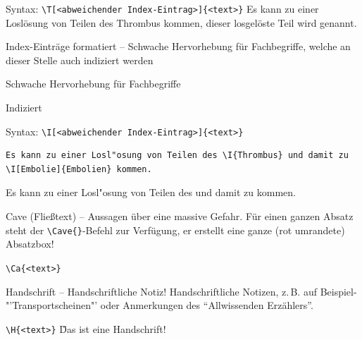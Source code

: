 \documentclass[
ngerman,
paper=a4,
asymmetric,
fontsize=10pt,
draft=false,
numbers=noenddot,
bibtotocnumbered,
footnotes=multiple,
toc=flat,
]{scrbook}
\newenvironment{Beispiel}
{\begin{tcolorbox}[title=Beispiel]

}{\end{tcolorbox}}
\begin{document}
\begin{Beispiel}
Syntax: \lstinline$\T[<abweichender Index-Eintrag>]{<text>}$
\tcblower
Es kann zu einer Loslösung von Teilen des Thrombus kommen, dieser
losgelöste Teil wird  genannt.
\end{Beispiel}






\TextSlide
{Index-Einträge formatiert -- }
{Schwache Hervorhebung für Fachbegriffe, welche an dieser
Stelle auch indiziert werden}
{Schwache Hervorhebung für
Fachbegriffe

Indiziert}
{}
{}
{}


\begin{Beispiel}
Syntax: \lstinline$\I[<abweichender Index-Eintrag>]{<text>}$

\begin{lstlisting}
Es kann zu einer Losl"osung von Teilen des \I{Thrombus} und damit zu \I[Embolie]{Embolien} kommen.
\end{lstlisting}

\tcblower
Es kann zu einer Losl"osung von Teilen des  und
damit zu  kommen.
\end{Beispiel}




\Text
{Cave (Fließtext) -- }
{Aussagen über eine massive Gefahr.}
{}
{}
{}
{}
Für einen ganzen Absatz steht der
    \lstinline$\Cave{}$-Befehl zur Verfügung, er erstellt eine ganze (rot
    umrandete) Absatzbox!

\bigskip

\begin{Beispiel}\lstinline$\Ca{<text>}$\tcblower
\end{Beispiel}




\Text
{Handschrift -- }
{Handschriftliche Notiz!}
{}
{}
{}
{}
Handschriftliche Notizen, z.\,B. auf
Beispiel-"'Transportscheinen"'
oder Anmerkungen des "`Allwissenden Erzählers"'.



\begin{Beispiel}\lstinline$\H{<text>}$\tcblower
\H{Das ist eine Handschrift!}
\end{Beispiel}
\end{document}
